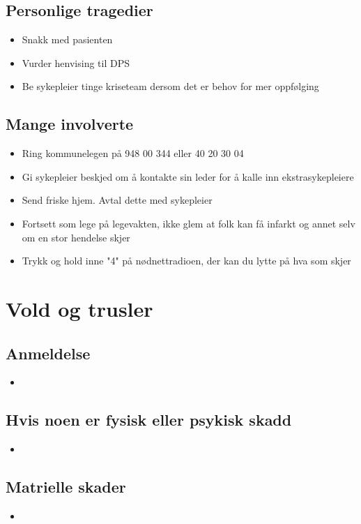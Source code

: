 \documentclass[12pt,a4paper]{memoir}
\newcommand{\pawmob}{948 00 344 }
\newcommand{\ebmob}{40 20 30 04}
\begin{document}
	\section{Personlige tragedier}
		\begin{itemize}
			\item Snakk med pasienten
			\item Vurder henvising til DPS
			\item Be sykepleier tinge kriseteam dersom det er behov for mer oppfølging
		\end{itemize}
	\section{Mange involverte}
		\begin{itemize}
			\item Ring kommunelegen på \pawmob eller \ebmob
			\item Gi sykepleier beskjed om å kontakte sin leder for å kalle inn ekstrasykepleiere
			\item Send friske hjem. Avtal dette med sykepleier
			\item Fortsett som lege på legevakten, ikke glem at folk kan få infarkt og annet selv om en stor hendelse skjer
			\item Trykk og hold inne "4" på nødnettradioen, der kan du lytte på hva som skjer
		\end{itemize}

\newpage
\chapter{Vold og trusler}
	\section{Anmeldelse}
		\begin{itemize}
			\item
		\end{itemize}
	\section{Hvis noen er fysisk eller psykisk skadd}
		\begin{itemize}
			\item
		\end{itemize}
	\section{Matrielle skader} 
		\begin{itemize}
			\item
		\end{itemize}
\end{document}
